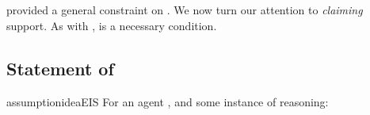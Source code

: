 \section{}
\label{sec:ideaCS}

\begin{note}
  \ideaS{} provided a general constraint on \support{}.
  We now turn our attention to \emph{claiming} support.
  As with \ideaS{}, \ideaCS{} is a necessary condition.
\end{note}

\subsection{Statement of \ideaCS{}}
\label{sec:ideaCS:statement}

\begin{note}
  \begin{restatable}{assumption}{ideaEIS}
    \label{idea:CS:B}
    \label{assumption:CS}
    For an agent \vAgent{}, and some instance of reasoning:


\end{restatable}
\end{note}
